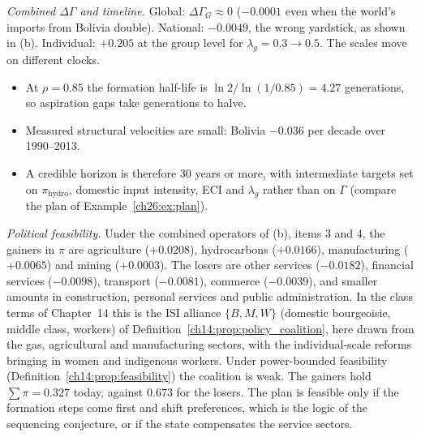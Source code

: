\documentclass[../solutions_manual.tex]{subfiles}
\begin{document}
 \emph{Combined $\Delta\Gamma$ and timeline.} Global: $\Delta\Gamma_G \approx 0$ ($-0.0001$ even when the world's imports from Bolivia double). National: $-0.0049$, the wrong yardstick, as shown in (b). Individual: $+0.205$ at the group level for $\lambda_g = 0.3 \to 0.5$. The scales move on different clocks.
\begin{itemize}
\item At $\rho = 0.85$ the formation half-life is $\ln 2/\ln(1/0.85) = 4.27$ generations, so aspiration gaps take generations to halve.
\item Measured structural velocities are small: Bolivia $-0.036$ per decade over 1990--2013.
\item A credible horizon is therefore 30 years or more, with intermediate targets set on $\pi_{\text{hydro}}$, domestic input intensity, ECI and $\lambda_g$ rather than on $\Gamma$ (compare the plan of Example~\ref{ch26:ex:plan}).
\end{itemize}

 \emph{Political feasibility.} Under the combined operators of (b), items 3 and 4, the gainers in $\pi$ are agriculture ($+0.0208$), hydrocarbons ($+0.0166$), manufacturing ($+0.0065$) and mining ($+0.0003$). The losers are other services ($-0.0182$), financial services ($-0.0098$), transport ($-0.0081$), commerce ($-0.0039$), and smaller amounts in construction, personal services and public administration. In the class terms of Chapter~14 this is the ISI alliance $\{B, M, W\}$ (domestic bourgeoisie, middle class, workers) of Definition~\ref{ch14:prop:policy_coalition}, here drawn from the gas, agricultural and manufacturing sectors, with the individual-scale reforms bringing in women and indigenous workers. Under power-bounded feasibility (Definition~\ref{ch14:prop:feasibility}) the coalition is weak. The gainers hold $\sum\pi = 0.327$ today, against $0.673$ for the losers. The plan is feasible only if the formation steps come first and shift preferences, which is the logic of the sequencing conjecture, or if the state compensates the service sectors.
\end{document}
